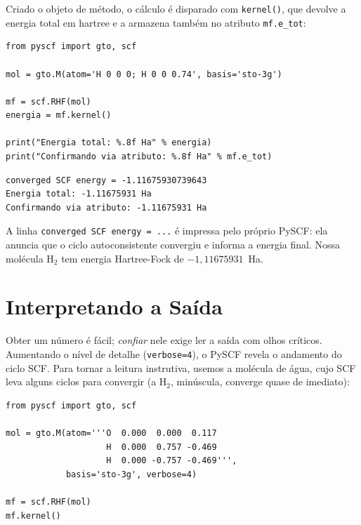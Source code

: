 \documentclass[11pt,a4paper,openany]{book}
\newcommand{\code}[1]{\texttt{#1}}
\newcommand{\pyscf}{\textsf{PySCF}}
\begin{document}
\noindent
Criado o objeto de método, o cálculo é disparado com \code{kernel()}, que devolve a
energia total em hartree e a armazena também no atributo \code{mf.e\_tot}:

\begin{lstlisting}[style=python,caption={Um cálculo Hartree-Fock completo da H$_2$.},label={lst:hfcompleto}]
from pyscf import gto, scf

mol = gto.M(atom='H 0 0 0; H 0 0 0.74', basis='sto-3g')

mf = scf.RHF(mol)
energia = mf.kernel()

print("Energia total: %.8f Ha" % energia)
print("Confirmando via atributo: %.8f Ha" % mf.e_tot)
\end{lstlisting}

\begin{lstlisting}[style=console]
converged SCF energy = -1.11675930739643
Energia total: -1.11675931 Ha
Confirmando via atributo: -1.11675931 Ha
\end{lstlisting}

\noindent
A linha \code{converged SCF energy = ...} é impressa pelo próprio \pyscf{}: ela
anuncia que o ciclo autoconsistente convergiu e informa a energia final. Nossa
molécula H$_2$ tem energia Hartree-Fock de $-1{,}11675931$~Ha.

\section{Interpretando a Saída}
\label{sec:saida}

Obter um número é fácil; \emph{confiar} nele exige ler a saída com olhos críticos.
Aumentando o nível de detalhe (\code{verbose=4}), o \pyscf{} revela o andamento do
ciclo SCF. Para tornar a leitura instrutiva, usemos a molécula de água, cujo SCF
leva alguns ciclos para convergir (a H$_2$, minúscula, converge quase de
imediato):

\begin{lstlisting}[style=python,caption={Acompanhando a convergência do SCF.},label={lst:h2o}]
from pyscf import gto, scf

mol = gto.M(atom='''O  0.000  0.000  0.117
                    H  0.000  0.757 -0.469
                    H  0.000 -0.757 -0.469''',
            basis='sto-3g', verbose=4)

mf = scf.RHF(mol)
mf.kernel()
\end{lstlisting}
\end{document}
